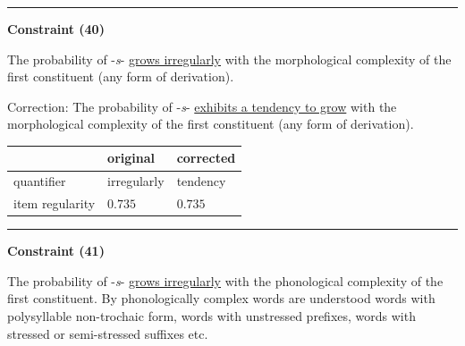 \vspace{-0.75em}
\hrule




\vspace{0.6em}

\begin{center}
\textbf{Constraint (40)}
\end{center}

\noindent
The probability of -\textit{s}- \underline{grows irregularly} with the morphological complexity of the first constituent (any form of derivation).
\vspace{0.3em}

\noindent
Correction: The probability of -\textit{s}- \underline{exhibits a tendency to grow} with the morphological complexity of the first constituent (any form of derivation).

\vspace{-0.25em}

\begin{table}[!ht]

\begin{center}

\begin{tabularx}{\columnwidth}{|X|X|X|}
      \hline
                        & original      & corrected \\
      \hline
      quantifier        & irregularly      & tendency   \\
      \hline
      item regularity   & $0.735$      & $0.735$   \\
      \hline
\end{tabularx}
\end{center}
\end{table}

\vspace{-0.75em}
\hrule


\vspace{0.6em}

\begin{center}
\textbf{Constraint (41)}
\end{center}

\noindent
The probability of -\textit{s}- \underline{grows irregularly} with the phonological complexity of the first constituent. By phonologically complex words are understood words with polysyllable non-trochaic form, words with unstressed prefixes, words with stressed or semi-stressed suffixes etc.
\vspace{0.3em}

